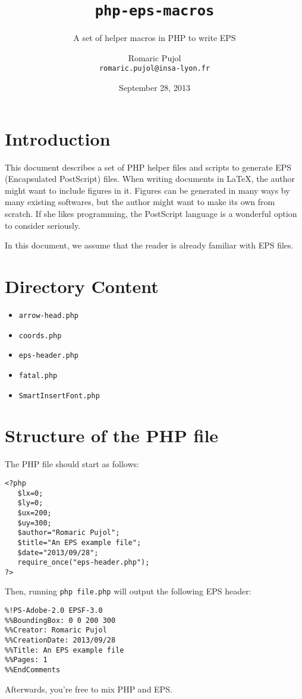 \documentclass[a4paper]{scrartcl}
\title{\texttt{php-eps-macros}}
\subtitle{A set of helper macros in PHP to write EPS}
\author{Romaric Pujol\\\footnotesize{\texttt{romaric.pujol@insa-lyon.fr}}}
\date{September 28, 2013}
\newcommand\code[1]{\lstinline{#1}}
\begin{document}
\maketitle
\section{Introduction}
This document describes a set of PHP helper files and scripts to generate EPS
   (Encapsulated PostScript) files.
When writing documents in \LaTeX, the author might want to include figures in
   it.
Figures can be generated in many ways by many existing softwares, but the
   author might want to make its own from scratch.
If she likes programming, the PostScript language is a wonderful option to
   consider seriously.

In this document, we assume that the reader is already familiar with EPS files.

\section{Directory Content}
\begin{itemize}
\item \texttt{arrow-head.php}
\item \texttt{coords.php}
\item \texttt{eps-header.php}
\item \texttt{fatal.php}
\item \texttt{SmartInsertFont.php}
\end{itemize}

\section{Structure of the PHP file}
The PHP file should start as follows:
\lstset{language=PHP}
\begin{lstlisting}
<?php
   $lx=0;
   $ly=0;
   $ux=200;
   $uy=300;
   $author="Romaric Pujol";
   $title="An EPS example file";
   $date="2013/09/28";
   require_once("eps-header.php");
?>
\end{lstlisting}

Then, running \code{php file.php} will output the following EPS header:
\begin{lstlisting}
%!PS-Adobe-2.0 EPSF-3.0
%%BoundingBox: 0 0 200 300
%%Creator: Romaric Pujol
%%CreationDate: 2013/09/28
%%Title: An EPS example file
%%Pages: 1
%%EndComments
\end{lstlisting}

Afterwards, you're free to mix PHP and EPS.
\end{document}
